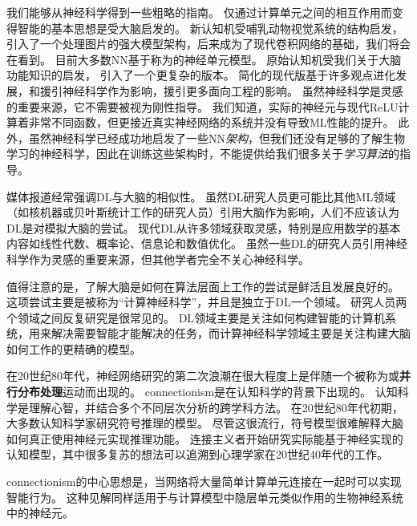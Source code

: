 我们能够从神经科学得到一些粗略的指南。
仅通过计算单元之间的相互作用而变得智能的基本思想是受大脑启发的。
新认知机\citep{Fukushima80}受哺乳动物视觉系统的结构启发，引入了一个处理图片的强大模型架构，后来成为了现代卷积网络的基础\citep{LeCun98-small}，我们将会在看到。
目前大多数\gls{NN}基于称为的神经单元模型。
原始认知机\citep{Fukushima75}受我们关于大脑功能知识的启发， 引入了一个更复杂的版本。
简化的现代版基于许多观点进化发展，\citet{Nair-2010}和\citet{Glorot+al-AI-2011-small}援引神经科学作为影响，\citet{Jarrett-ICCV2009}援引更多面向工程的影响。
虽然神经科学是灵感的重要来源，它不需要被视为刚性指导。
我们知道，实际的神经元与现代\gls{ReLU}计算着非常不同函数，但更接近真实神经网络的系统并没有导致\gls{ML}性能的提升。
此外，虽然神经科学已经成功地启发了一些\gls{NN}\emph{架构}，但我们还没有足够的了解生物学习的神经科学，因此在训练这些架构时，不能提供给我们很多关于\emph{学习算法}的指导。

媒体报道经常强调\gls{DL}与大脑的相似性。
虽然\gls{DL}研究人员更可能比其他\gls{ML}领域（如核机器或贝叶斯统计工作的研究人员）引用大脑作为影响，人们不应该认为\gls{DL}是对模拟大脑的尝试。
现代\gls{DL}从许多领域获取灵感，特别是应用数学的基本内容如线性代数、概率论、信息论和数值优化。
虽然一些\gls{DL}的研究人员引用神经科学作为灵感的重要来源，但其他学者完全不关心神经科学。


值得注意的是，了解大脑是如何在算法层面上工作的尝试是鲜活且发展良好的。
这项尝试主要是被称为``计算神经科学''，并且是独立于\gls{DL}一个领域。
研究人员两个领域之间反复研究是很常见的。
\gls{DL}领域主要是关注如何构建智能的计算机系统，用来解决需要智能才能解决的任务，而计算神经科学领域主要是关注构建大脑如何工作的更精确的模型。

在20世纪80年代，神经网络研究的第二次浪潮在很大程度上是伴随一个被称为或\textbf{并行分布处理}运动而出现的\citep{Rumelhart86,mcclelland1995appeal}。
\gls{connectionism}是在认知科学的背景下出现的。
认知科学是理解心智，并结合多个不同层次分析的跨学科方法。
在20世纪80年代初期，大多数认知科学家研究符号推理的模型。
尽管这很流行，符号模型很难解释大脑如何真正使用神经元实现推理功能。 
连接主义者开始研究实际能基于神经实现的认知模型\citep{Touretzky1985}，其中很多复苏的想法可以追溯到心理学家在20世纪40年代的工作\citep{Hebb49}。

\gls{connectionism}的中心思想是，当网络将大量简单计算单元连接在一起时可以实现智能行为。
这种见解同样适用于与计算模型中隐层单元类似作用的生物神经系统中的神经元。  

